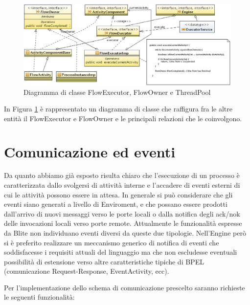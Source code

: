 \begin{figure}[!t]
\begin{center}
\includegraphics[angle=90,scale=0.60]
{architettura_interna/dia/flowClassDiagram}
\caption[Diagramma di classe FlowExecutor \ldots] {
   	Diagramma di classe FlowExecutor, FlowOwner e ThreadPool}
  \label{fig:flowclass}
\end{center}
\end{figure}

In Figura \ref{fig:flowclass} \`e rappresentato un diagramma di classe che
raffigura fra le altre entità il FlowExecutor e FlowOwner e le principali
relazioni che le coinvolgono.

\section{Comunicazione ed eventi}
Da quanto abbiamo già esposto risulta chiaro che l'esecuzione di un processo \`e
caratterizzata dallo svolgersi di attività interne e l'accadere di eventi
esterni di cui le attività possono essere in attesa. In generale si può
considerare che gli eventi siano generati a livello di Enviroment, e che possano
essere prodotti dall'arrivo di nuovi messaggi verso le porte locali o
dalla notifica degli ack/nok delle invocazioni locali
verso porte remote. Attualmente le funzionalità espresse da Blite non
individuano eventi diversi da queste due tipologie. Nell'Engine però si \`e
preferito realizzare un meccanismo generico di notifica di eventi che
soddisfacesse i requisiti attuali del linguaggio ma che non escludesse eventuali
possibilità di estensione verso altre caratteristiche tipiche di BPEL
(comunicazione Request-Response, EventActivity, ecc).

Per l'implementazione dello schema di comunicazione prescelto saranno richieste
le seguenti funzionalità:

